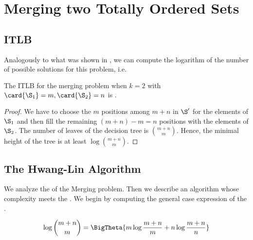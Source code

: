 \section{Merging two Totally Ordered Sets}
\label{tree:merging:k=2}

\subsection*{ITLB}
\label{tree:merging:k=2:ITLB}

Analogously to what was shown in , we can compute the
logarithm of the number of possible solutions for this problem, i.e.

\begin{theorem}
The ITLB for the merging problem when \(k = 2\) with \(\card{\S_1} = m, \card{\S_2}
= n\) is .
\end{theorem}

\begin{proof}
We have to choose the $m$ positions among $m+n$ in $\S'$ for the elements of
$\S_1$ and then fill the remaining $(m+n) - m = n$ positions with the elements
of $\S_2$. The number of leaves of the decision tree is $\binom{m+n}{m}$.
Hence, the minimal height of the tree is at least $\log \binom{m+n}{m}$.
\end{proof}



\subsection*{The Hwang-Lin Algorithm}
\label{tree:merging:k=2:alg}

We analyze the  of the Merging problem. Then we
describe an algorithm whose complexity meets the . We begin by
computing the general case expression of the .

\begin{lemma}
\begin{align*}
\log\binom{m+n}{m} &= \BigTheta{m \log\frac{m+n}{m} + n \log\frac{m+n}{n}}\\
\end{align*}
\end{lemma}

